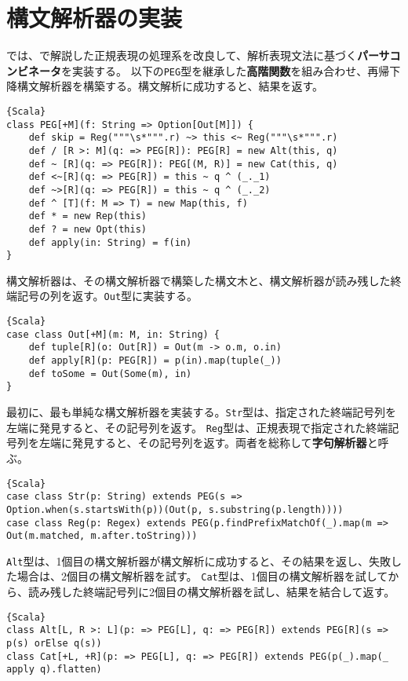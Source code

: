 \documentclass[10pt,a4paper]{book}
\begin{document}
\section{構文解析器の実装\label{sect:parsec}}

では、で解説した正規表現の処理系を改良して、解析表現文法に基づく\textbf{パーサコンビネータ}を実装する。
以下の\texttt{PEG}型を継承した\textbf{高階関数}を組み合わせ、再帰下降構文解析器を構築する。構文解析に成功すると、結果を返す。

\begin{Verbatim}{Scala}
class PEG[+M](f: String => Option[Out[M]]) {
	def skip = Reg("""\s*""".r) ~> this <~ Reg("""\s*""".r)
	def / [R >: M](q: => PEG[R]): PEG[R] = new Alt(this, q)
	def ~ [R](q: => PEG[R]): PEG[(M, R)] = new Cat(this, q)
	def <~[R](q: => PEG[R]) = this ~ q ^ (_._1)
	def ~>[R](q: => PEG[R]) = this ~ q ^ (_._2)
	def ^ [T](f: M => T) = new Map(this, f)
	def * = new Rep(this)
	def ? = new Opt(this)
	def apply(in: String) = f(in)
}
\end{Verbatim}

構文解析器は、その構文解析器で構築した構文木と、構文解析器が読み残した終端記号の列を返す。\texttt{Out}型に実装する。

\begin{Verbatim}{Scala}
case class Out[+M](m: M, in: String) {
	def tuple[R](o: Out[R]) = Out(m -> o.m, o.in)
	def apply[R](p: PEG[R]) = p(in).map(tuple(_))
	def toSome = Out(Some(m), in)
}
\end{Verbatim}

最初に、最も単純な構文解析器を実装する。\texttt{Str}型は、指定された終端記号列を左端に発見すると、その記号列を返す。
\texttt{Reg}型は、正規表現で指定された終端記号列を左端に発見すると、その記号列を返す。両者を総称して\textbf{字句解析器}と呼ぶ。

\begin{Verbatim}{Scala}
case class Str(p: String) extends PEG(s => Option.when(s.startsWith(p))(Out(p, s.substring(p.length))))
case class Reg(p: Regex) extends PEG(p.findPrefixMatchOf(_).map(m => Out(m.matched, m.after.toString)))
\end{Verbatim}

\texttt{Alt}型は、1個目の構文解析器が構文解析に成功すると、その結果を返し、失敗した場合は、2個目の構文解析器を試す。
\texttt{Cat}型は、1個目の構文解析器を試してから、読み残した終端記号列に2個目の構文解析器を試し、結果を結合して返す。

\begin{Verbatim}{Scala}
class Alt[L, R >: L](p: => PEG[L], q: => PEG[R]) extends PEG[R](s => p(s) orElse q(s))
class Cat[+L, +R](p: => PEG[L], q: => PEG[R]) extends PEG(p(_).map(_ apply q).flatten)
\end{Verbatim}
\end{document}

